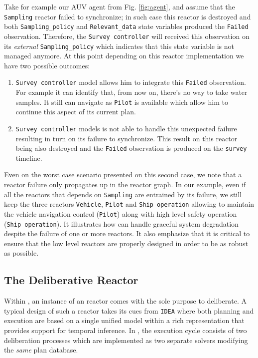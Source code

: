 Take for example our AUV agent from Fig. \ref{fig:agent},
and assume that the \texttt{Sampling} reactor failed to synchronize;
in  such case this reactor is destroyed and both
\texttt{Sampling\_policy} and \texttt{Relevant\_data} state variables
produced the \texttt{Failed} observation. Therefore, the
\texttt{Survey controller} will received this observation on its {\em
  external} \texttt{Sampling\_policy} which indicates that this state
variable is not managed anymore. At this point depending on this
reactor implementation we have two possible outcomes:
\begin{enumerate}
\item \texttt{Survey  controller} model allows him to integrate this
  \texttt{Failed} observation. For example it can identify that, from
  now on, there's no way to take water samples. It still can 
  navigate as \texttt{Pilot} is available which allow him to continue
  this aspect of its current plan.
\item \texttt{Survey controller} models is not able to handle this
  unexpected failure resulting in turn on its failure to
  synchronize. This result on this reactor being also destroyed and
  the \texttt{Failed} observation is produced on the \texttt{survey}
  timeline.
\end{enumerate}
Even on the worst case scenario presented on this second case, we
note that a reactor failure only propagates up in the reactor graph. 
In our example, even if all the reactors that depends on
\texttt{Sampling} are entrained by its failure, we still keep the
three reactors \texttt{Vehicle}, \texttt{Pilot} and \texttt{Ship
  operation} allowing to  maintain the vehicle navigation control
(\texttt{Pilot}) along with high level safety operation 
(\texttt{Ship operation}). It illustrates how \rx can handle graceful
system degradation despite the failure of one or more reactors. It
also emphasize that it is critical to ensure that the low level
reactors are properly designed in order to be as robust as 
possible. 


\subsection{The  Deliberative Reactor}
\label{sec:arch:europa}

Within \rxe, an instance of an \eu reactor comes with the sole purpose
to deliberate. A typical design of such a reactor takes its cues from
\texttt{IDEA} \cite{mus02, mus06} where both planning and execution
are based on a single unified model within a rich representation that
provides support for temporal inference. In \rxe, the execution cycle
consists of two deliberation processes which are implemented as two
separate \eu solvers modifying the \emph{same} plan database.

